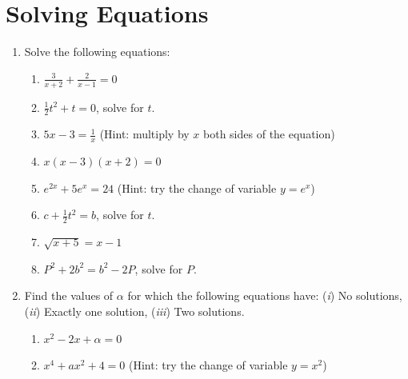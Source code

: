 \documentclass{article}
\begin{document}
\section{Solving Equations}

\begin{enumerate}[leftmargin = 0.5cm, label = \arabic*., rightmargin = 0.2cm]
    
    \item Solve the following equations:
    
    \begin{enumerate}[leftmargin = 0.5cm, label = (\alph*), rightmargin = 0.2cm]

    \item $\frac{3}{x+2} + \frac{2}{x-1} = 0$

    \item $\frac{1}{2}t^2 + t = 0$, solve for $t$.

    \item $5x - 3 = \frac{1}{x}$ (Hint: multiply by $x$ both sides of the equation)

    \item $x(x-3)(x+2) = 0$

    \item $e^{2x} + 5e^{x} = 24$ (Hint: try the change of variable $y = e^x$)
    
    \item $c + \frac{1}{2}t^2 = b$, solve for $t$.

    \item $\sqrt{x + 5} = x - 1$

    \item $P^2 + 2b^2 = b^2 - 2P$, solve for $P$.
    
    \end{enumerate}
    
    \item Find the values of $\alpha$ for which the following equations have: (\textit{i}) No solutions, (\textit{ii}) Exactly one solution, (\textit{iii}) Two solutions. 

    \begin{enumerate}[leftmargin = 0.5cm, label = (\alph*), rightmargin = 0.2cm]

    \item $x^2 - 2x + \alpha = 0$

    \item $x^4 + ax^2 + 4 = 0$ (Hint: try the change of variable $y = x^2$)
        
    \end{enumerate}
    
    \end{enumerate}
\end{document}
